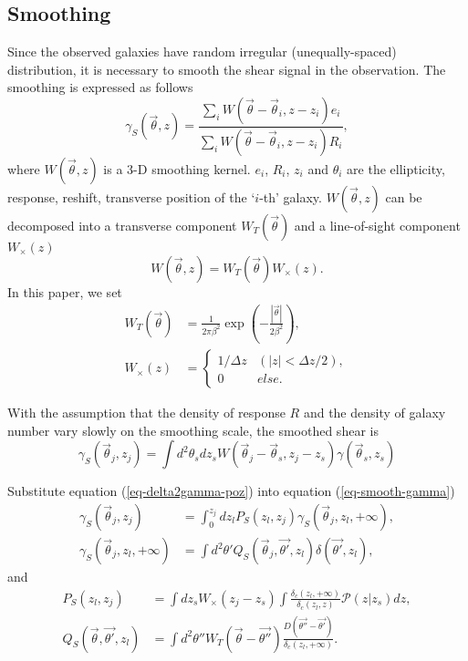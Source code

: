 \documentclass[twocolumn]{aastex62}
\newcommand{\vecb}[1]{{#1}}
\begin{document}
\subsection{Smoothing}
Since the observed galaxies have random irregular (unequally-spaced) distribution, it is necessary to smooth the shear signal in the observation. The smoothing is expressed as follows
\begin{equation}
\gamma_S  (\vec{\theta},z)  = \frac{\sum_i  W(\vec{\theta}-\vec{{\theta}}_i,z-z_i) e_i}{\sum_i W(\vec{\theta}-\vec{{\theta}}_i,z-z_i) R_i},
\end{equation}
where $W(\vec{\theta},z)$ is a $3$-D smoothing kernel. $e_i$, $R_i$, $z_i$ and $\theta_i$ are the ellipticity, response, reshift, transverse position of the `$i$-th' galaxy.
$W(\vec{\theta},z)$ can be decomposed into a transverse component $W_T(\vec{\theta})$ and a line-of-sight component $W_\times(z)$
\begin{equation}
W(\vec{\theta},z)=W_T(\vec{\theta}) W_\times (z).
\end{equation}
In this paper, we set
\begin{equation}
\begin{split}
W_T(\vec{\theta}) &=\frac{1}{2\pi\beta^2}\exp(-\frac{|\vec{\theta}|}{2\beta^2}),\\
W_\times (z) &= 
\begin{cases}
1/\Delta z& (|z|<\Delta z/2),\\
0& else.
\end{cases}
\end{split}
\end{equation}

With the assumption that the density of response $R$ and the density of galaxy number vary slowly on the smoothing scale, the smoothed shear is 
\begin{equation}\label{eq-smooth-gamma}
\gamma_S(\vec{\theta}_j,z_j)= \int d^2 \theta_s d z_sW(\vec{\theta}_j-\vec{{\theta}}_s,z_j-z_s) \gamma(\vec{\theta}_s,z_s)
\end{equation}

Substitute equation (\ref{eq-delta2gamma-poz}) into equation (\ref{eq-smooth-gamma})
\begin{equation}\label{eq-delta2gamma-smooth}
\begin{split}
\gamma_S(\vec{\theta}_j,z_j) &= \int_0^{z_j} dz_l P_S(z_l,z_j)\gamma_S(\vec{\theta}_j,z_l,+\infty),\\
\gamma_S(\vec{\theta}_j,z_l,+\infty)&= \int d^2 \theta'   Q_S(\vec{\theta}_j,\vec{\theta'},z_l) \delta(\vec{\theta'},z_l),
\end{split}
\end{equation}
and
\begin{equation}
\begin{split}
P_S(z_l,z_j)&=\int  dz_s W_\times (z_j-z_s) \int \frac{\delta_c(z_l,+\infty)}{\delta_{c}(z_l,z)} \mathcal{P}(z|z_s) dz,\\
Q_S(\vec{\theta},\vec{\theta'},z_l)&=\int d^2\theta'' W_T( \vec{\theta} -\vec{\theta''} )  \frac{\vecb{D}(\vec{\theta''}-\vec{\theta'})}{\delta_c(z_l,+\infty)}.
\end{split}
\end{equation}
\end{document}
